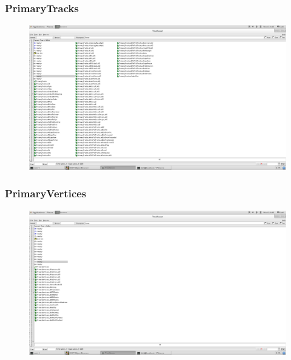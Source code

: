 \documentclass[10pt]{beamer}
\begin{document}
\label{PrimaryTracks}
\begin{frame}
  \frametitle{PrimaryTracks}
  \begin{figure}[hbtp]
    \centering
    \includegraphics[width=\textwidth]{PrimaryTracks.png}
  \end{figure}
\end{frame}
\label{PrimaryVertices}
\begin{frame}
  \frametitle{PrimaryVertices}
  \begin{figure}[hbtp]
    \centering
    \includegraphics[width=\textwidth]{PrimaryVertices.png}
  \end{figure}
\end{frame}
\label{RichSpectra}
\end{document}

